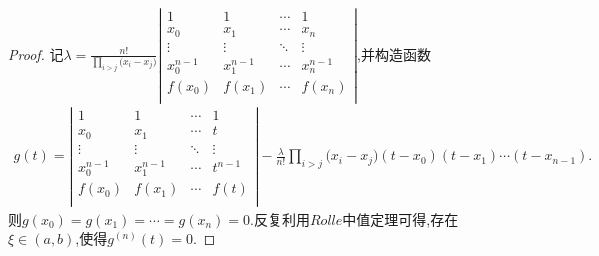 \documentclass[lang=cn,newtx,10pt,scheme=chinese]{elegantbook}
\begin{document}
\begin{proof}
    记$\lambda =\frac{n!}{\prod_{i>j}{(x_i}-x_j)}\left| \begin{matrix}
        1&		1&		\cdots&		1\\
        x_0&		x_1&		\cdots&		x_n\\
        \vdots&		\vdots&		\ddots&		\vdots\\
        x_{0}^{n-1}&		x_{1}^{n-1}&		\cdots&		x_{n}^{n-1}\\
        f(x_0)&		f(x_1)&		\cdots&		f(x_n)\\
    \end{matrix} \right|$,并构造函数
    \begin{align}
        g\left( t \right) =\left| \begin{matrix}
            1&		1&		\cdots&		1\\
            x_0&		x_1&		\cdots&		t\\
            \vdots&		\vdots&		\ddots&		\vdots\\
            x_{0}^{n-1}&		x_{1}^{n-1}&		\cdots&		t^{n-1}\\
            f(x_0)&		f(x_1)&		\cdots&		f(t)\\
        \end{matrix} \right|-\frac{\lambda}{n!}\prod_{i>j}{(x_i}-x_j)\left( t-x_0 \right) \left( t-x_1 \right) \cdots \left( t-x_{n-1} \right) .
        \nonumber
    \end{align}
    则$g\left( x_0 \right) =g\left( x_1 \right) =\cdots =g\left( x_n \right) =0$.反复利用$Rolle$中值定理可得,存在$\xi\in(a,b)$,使得$g^{(n)}(t)=0$.


\end{proof}
\end{document}
